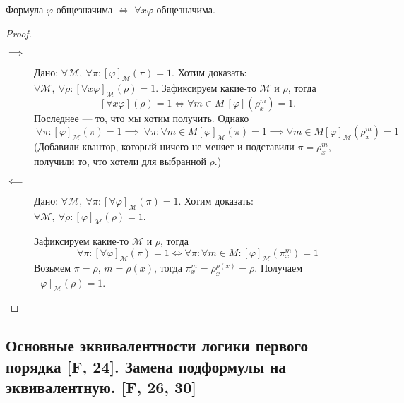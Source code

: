 \documentclass[a4paper, fleqn]{article}
\begin{document}
    \begin{lemma}
        Формула $\varphi$ общезначима $\iff$ $\forall x \varphi$ общезначима.
    \end{lemma}
    
    \begin{proof}~
        \begin{description}
            \item[$\implies$] Дано: $\forall \mathcal{M},~\forall \pi \colon [\varphi]_{\mathcal{M}}(\pi) = 1$.
            Хотим доказать: $\forall \mathcal{M},~\forall \rho \colon [\forall x \varphi]_{\mathcal{M}}(\rho) = 1$.
            Зафиксируем какие-то $\mathcal{M}$ и $\rho$, тогда
            $$
                [\forall x \varphi](\rho) = 1 \iff \forall m \in M~ [\varphi]\left(\rho_{x}^{m}\right) = 1.
            $$
            Последнее --- то, что мы хотим получить. Однако 
            $$
                ~\forall \pi \colon [\varphi]_{\mathcal{M}}(\pi) = 1 \implies
                ~\forall \pi \colon \forall m \in M [\varphi]_{\mathcal{M}}(\pi) = 1 \implies
                \forall m \in M [\varphi]_{\mathcal{M}}(\rho_{x}^{m}) = 1
            $$
            (Добавили квантор, который ничего не меняет и подставили $\pi = \rho_{x}^{m}$, получили
            то, что хотели для выбранной $\rho$.)
            
            \item[$\impliedby$] Дано: $\forall \mathcal{M},~\forall \pi \colon [\forall\varphi]_{\mathcal{M}}(\pi) = 1$.
            Хотим доказать: $\forall \mathcal{M},~\forall \rho \colon [\varphi]_{\mathcal{M}}(\rho) = 1$.

            Зафиксируем какие-то $\mathcal{M}$ и $\rho$, тогда
            $$
                \forall \pi \colon [\forall\varphi]_{\mathcal{M}}(\pi) = 1 \iff
                \forall \pi \colon \forall m \in M \colon [\varphi]_{\mathcal{M}}\left(\pi_{x}^{m}\right) = 1
            $$
            Возьмем $\pi = \rho$, $m = \rho(x)$, тогда $\pi_{x}^{m} = \rho_{x}^{\rho(x)} = \rho$. 
            Получаем $[\varphi]_{\mathcal{M}}(\rho) = 1$.
        \end{description}
    \end{proof}

    \subsection{Основные эквивалентности логики первого порядка [F, 24]. Замена подформулы на эквивалентную. [F, 26, 30]}
\end{document}
